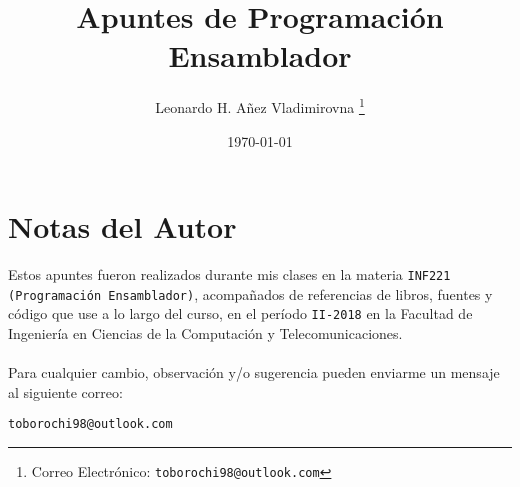 

\title{Apuntes de Programación Ensamblador}

\author{Leonardo H. Añez Vladimirovna%
  \thanks{Correo Electrónico: \texttt{toborochi98@outlook.com}}}
\date{\today}

\maketitle


\section*{Notas del Autor}
Estos apuntes fueron realizados durante mis clases en la materia \texttt{INF221 (Programación Ensamblador)}, acompañados de referencias de libros, fuentes y código que use a lo largo del curso, en el período \texttt{II-2018} en la Facultad de Ingeniería en Ciencias de la Computación y Telecomunicaciones. 
\\ \vspace{0.5cm} \\
Para cualquier cambio, observación y/o sugerencia pueden enviarme un mensaje al siguiente correo:
\begin{center}
 \texttt{toborochi98@outlook.com}
\end{center}

\tableofcontents
